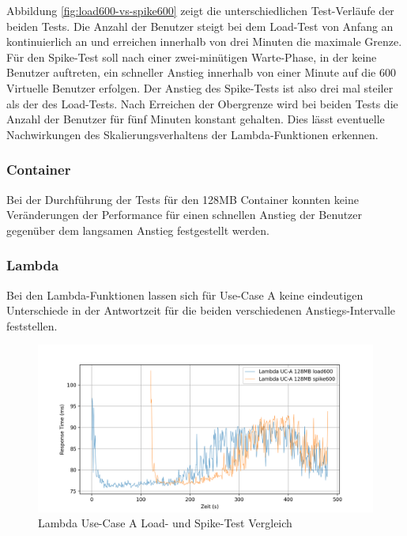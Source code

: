 Abbildung \ref{fig:load600-vs-spike600} zeigt die unterschiedlichen Test-Verläufe der beiden Tests. Die Anzahl der Benutzer steigt bei dem Load-Test von Anfang an kontinuierlich an und erreichen innerhalb von drei Minuten die maximale Grenze. Für den Spike-Test soll nach einer zwei-minütigen Warte-Phase, in der keine Benutzer auftreten, ein schneller Anstieg innerhalb von einer Minute auf die 600 Virtuelle Benutzer erfolgen. Der Anstieg des Spike-Tests ist also drei mal steiler als der des Load-Tests. 
Nach Erreichen der Obergrenze wird bei beiden Tests die Anzahl der Benutzer für fünf Minuten konstant gehalten. Dies lässt eventuelle Nachwirkungen des Skalierungsverhaltens der Lambda-Funktionen erkennen.


\subsubsection{Container}
Bei der Durchführung der Tests für den 128MB Container konnten keine Veränderungen der Performance für einen schnellen Anstieg der Benutzer gegenüber dem langsamen Anstieg festgestellt werden.

\subsubsection{Lambda}
Bei den Lambda-Funktionen lassen sich für Use-Case A keine eindeutigen Unterschiede in der Antwortzeit für die beiden verschiedenen Anstiegs-Intervalle feststellen. 


\begin{figure}[H]
    \includegraphics[width=\textwidth]{img/lambda-uca-load600-vs-spike600-example.png}
    \caption[Lambda Use-Case A Load- und Spike-Test Vergleich]{Lambda Use-Case A Load- und Spike-Test Vergleich}
    \label{fig:lambda-uca-load600-vs-spike600-example}
\end{figure}


